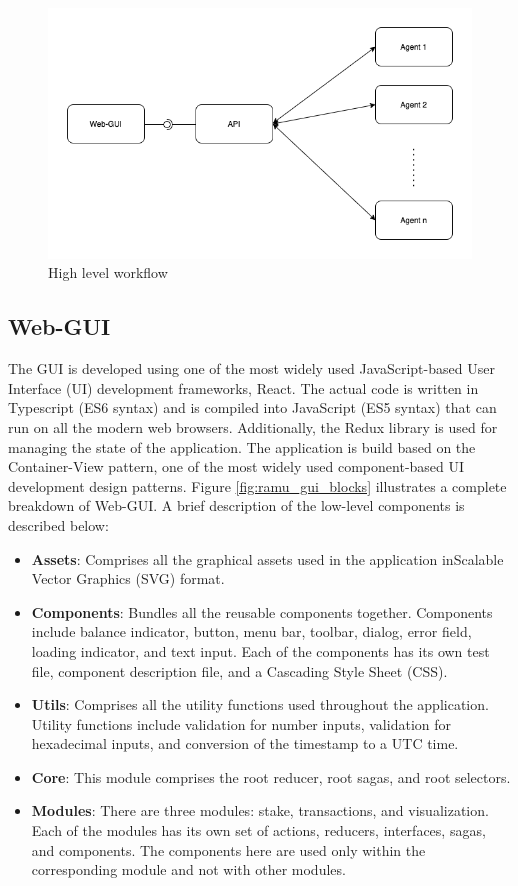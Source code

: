 \begin{figure}[htbp]
    \centering
    \includegraphics[width=0.8\linewidth]{figures/images/ramu/highlevel.png}
	\caption{High level workflow}
	\label{fig:ramu_highlevel_overview}
\end{figure}


\subsection{Web-GUI}
The GUI is developed using one of the most widely used JavaScript-based User Interface (UI) development frameworks, React. The actual code is written in Typescript (ES6 syntax) and is compiled into JavaScript (ES5 syntax) that can run on all the modern web browsers. Additionally, the Redux library is used for managing the state of the application. The application is build based on the Container-View pattern, one of the most widely used component-based UI development design patterns. Figure \ref{fig:ramu_gui_blocks} illustrates a complete breakdown of Web-GUI. A brief description of the low-level components is described below:

\begin{itemize}
	\item \textbf{Assets}: Comprises all the graphical assets used in the application inScalable Vector Graphics (SVG) format.
	\item \textbf{Components}: Bundles all the reusable components together. Components include balance indicator, button, menu bar, toolbar, dialog, error field, loading indicator, and text input. Each of the components has its own test file, component description file, and a Cascading Style Sheet (CSS).
	\item \textbf{Utils}: Comprises all the utility functions used throughout the application. Utility functions include validation for number inputs, validation for hexadecimal inputs, and conversion of the timestamp to a UTC time.
	\item \textbf{Core}: This module comprises the root reducer, root sagas, and root selectors.
	\item \textbf{Modules}: There are three modules: stake, transactions, and visualization. Each of the modules has its own set of actions, reducers, interfaces, sagas, and components. The components here are used only within the corresponding module and not with other modules.
\end{itemize}

